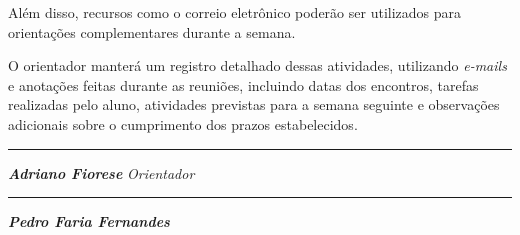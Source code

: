 \documentclass[11pt]{article}
\begin{document}
Além disso, recursos como o correio eletrônico poderão ser utilizados para orientações complementares durante a semana.

O orientador manterá um registro detalhado dessas atividades, utilizando \textit{e-mails} e anotações feitas durante as reuniões, incluindo datas dos encontros, tarefas realizadas pelo aluno, atividades previstas para a semana seguinte e observações adicionais sobre o cumprimento dos prazos estabelecidos.

	
	
	\vskip 5cm
	
	\begin{minipage}{0.49\linewidth}
	  \centering
	  \rule{7.2cm}{0.1mm}
	
	  \textbf{\textit{Adriano Fiorese}}
	  \newline
	  \textit{Orientador}
	\end{minipage}
	\begin{minipage}{0.49\linewidth}
	  \centering
	  \rule{7.2cm}{0.1mm}
	
	  \textbf{\textit{Pedro Faria Fernandes}}
	  \newline
	\end{minipage}

	
	
\end{document}
